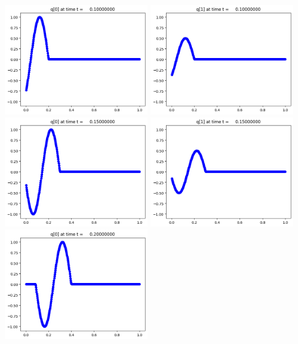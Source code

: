 \documentclass[11pt]{article}
\begin{document}
\vskip 10pt 
\includegraphics[width=0.475\textwidth]{frame0002fig0.png}
\includegraphics[width=0.475\textwidth]{frame0002fig1.png}
\vskip 10pt 
\includegraphics[width=0.475\textwidth]{frame0003fig0.png}
\includegraphics[width=0.475\textwidth]{frame0003fig1.png}
\vskip 10pt 
\includegraphics[width=0.475\textwidth]{frame0004fig0.png}
\end{document}
